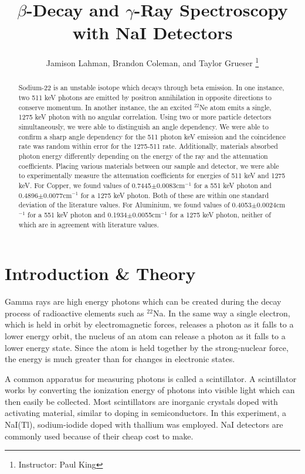 \documentclass[10pt]{IEEEtran}
\begin{document}
    \title{$\beta$-Decay and $\gamma$-Ray Spectroscopy with NaI Detectors}
    \author{Jamison Lahman, Brandon Coleman, and Taylor Grueser
    \thanks{Instructor: Paul King}}
    \maketitle

\begin{abstract}
	Sodium-22 is an unstable isotope which decays through beta emission. In one instance, two 511 keV photons are emitted by positron annihilation in opposite directions to conserve momentum. In another instance, the an excited $^{22}$Ne atom emits a single, 1275 keV photon with no angular correlation. Using two or more particle detectors simultaneously, we were able to distinguish an angle dependency. We were able to confirm a sharp angle dependency for the 511 photon keV emission and the coincidence rate was random within error for the 1275-511 rate. Additionally, materials absorbed photon energy differently depending on the energy of the ray and the attenuation coefficients. Placing various materials between our sample and detector, we were able to experimentally measure the attenuation coefficients for energies of 511 keV and 1275 keV. For Copper, we found values of 0.7445$\pm$0.0083cm$^{-1}$ for a 551 keV photon and 0.4896$\pm$0.0077cm$^{-1}$ for a 1275 keV photon. Both of these are within one standard deviation of the literature values. For Aluminium, we found values of 0.4053$\pm$0.0024cm$^{-1}$ for a 551 keV photon and 0.1934$\pm$0.0055cm$^{-1}$ for a 1275 keV photon, neither of which are in agreement with literature values. 
\end{abstract}

\section{Introduction \& Theory}
Gamma rays are high energy photons which can be created during the decay process of radioactive elements such as $^{22}$Na. In the same way a single electron, which is held in orbit by electromagnetic forces, releases a photon as it falls to a lower energy orbit, the nucleus of an atom can release a photon as it falls to a lower energy state. Since the atom is held together by the strong-nuclear force, the energy is much greater than for changes in electronic states.

A common apparatus for measuring photons is called a scintillator. A scintillator works by converting the ionization energy of photons into visible light which can then easily be collected. Most scintillators are inorganic crystals doped with activating material, similar to doping in semiconductors. In this experiment, a NaI(Tl), sodium-iodide doped with thallium was employed. NaI detectors are commonly used because of their cheap cost to make\cite{nucleons}.
\end{document}
